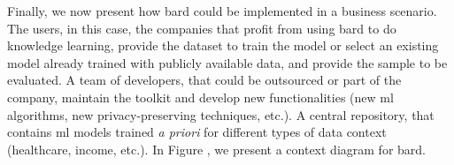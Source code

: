 Finally, we now present how \acs{bard} could be implemented in a business scenario. The users, in this case, the companies that profit from using \acs{bard} to do knowledge learning, provide the dataset to train the model or select an existing model already trained with publicly available data, and provide the sample to be evaluated. A team of developers, that could be outsourced or part of the company, maintain the toolkit and develop new functionalities (new \ac{ml} algorithms, new privacy-preserving techniques, etc.). A central repository, that contains \ac{ml} models trained \textit{a priori} for different types of data context (healthcare, income, etc.). In Figure , we present a context diagram for \acs{bard}. 

